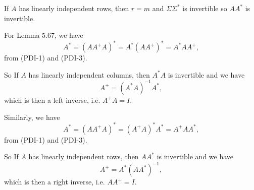 \documentclass[a4paper]{article}
\begin{document}
If $A$ has linearly independent rows, then $r=m$ and $\Sigma \Sigma^*$ is invertible so $AA^*$ is invertible.


For Lemma 5.67, we have
$$
A^*=(AA^+A)^*=A^*(AA^+)^*=A^*AA^+,
$$
from (PDI-1) and (PDI-3).

So If $A$ has linearly independent columns, then $A^*A$ is invertible and we have
$$
A^+=(A^*A)^{-1}A^*,
$$
which is then a left inverse, i.e. $A^+A=I$.

Similarly, we have
$$
A^*=(AA^+A)^*=(A^+A)^*A^*=A^+AA^*,
$$
from (PDI-1) and (PDI-3).

So If $A$ has linearly independent rows, then $AA^*$ is invertible and we have
$$
A^+=A^*(AA^*)^{-1},
$$
which is then a right inverse, i.e. $AA^+=I$.
\end{document}
